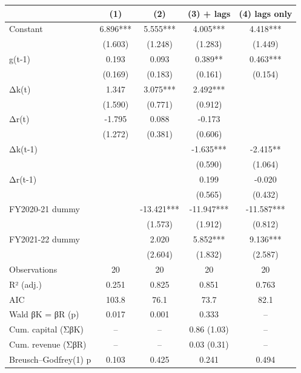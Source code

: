 \begin{tabular}{lcccc}
\toprule
 & (1) & (2) & (3) + lags & (4) lags only \\
\midrule
Constant & 6.896*** & 5.555*** & 4.005*** & 4.418*** \\
   & (1.603) & (1.248) & (1.283) & (1.449) \\
g(t-1) & 0.193 & 0.093 & 0.389** & 0.463*** \\
     & (0.169) & (0.183) & (0.161) & (0.154) \\
Δk(t) & 1.347 & 3.075*** & 2.492*** &  \\
       & (1.590) & (0.771) & (0.912) &  \\
Δr(t) & -1.795 & 0.088 & -0.173 &  \\
         & (1.272) & (0.381) & (0.606) &  \\
Δk(t-1) &  &  & -1.635*** & -2.415** \\
           &  &  & (0.590) & (1.064) \\
Δr(t-1) &  &  & 0.199 & -0.020 \\
             &  &  & (0.565) & (0.432) \\
FY2020-21 dummy &  & -13.421*** & -11.947*** & -11.587*** \\
               &  & (1.573) & (1.912) & (0.812) \\
FY2021-22 dummy &  & 2.020 & 5.852*** & 9.136*** \\
                 &  & (2.604) & (1.832) & (2.587) \\
Observations & 20 & 20 & 20 & 20 \\
R² (adj.) & 0.251 & 0.825 & 0.851 & 0.763 \\
AIC & 103.8 & 76.1 & 73.7 & 82.1 \\
Wald βK = βR (p) & 0.017 & 0.001 & 0.333 & – \\
Cum. capital (ΣβK) & – & – & 0.86 (1.03) & – \\
Cum. revenue (ΣβR) & – & – & 0.03 (0.31) & – \\
Breusch–Godfrey(1) p & 0.103 & 0.425 & 0.241 & 0.494 \\
\bottomrule
\end{tabular}
